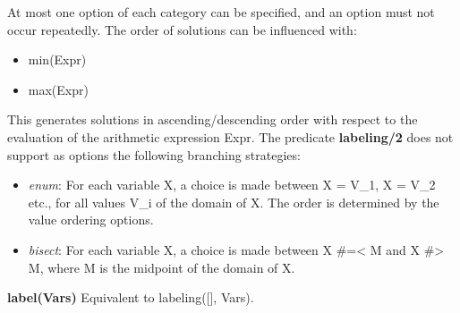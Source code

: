 At most one option of each category can be specified, and an option must not occur repeatedly.\newline
The order of solutions can be influenced with:\newline
\begin{itemize}
    \item min(Expr)
    \item max(Expr)
\end{itemize}

This generates solutions in ascending/descending order with respect to the evaluation of the arithmetic expression Expr.\newline
The predicate \textbf{labeling/2} does not support as options the following branching strategies:\newline
\begin{itemize}
    \item \textit{enum}: For each variable X, a choice is made between X = V\_1, X = V\_2 etc., for all values V\_i of the domain of X. The order is determined by the value ordering options.
    \item \textit{bisect}: For each variable X, a choice is made between X \#=< M and X \#> M, where M is the midpoint of the domain of X.
\end{itemize}
\textbf{label(Vars)}\newline\newline
Equivalent to labeling([], Vars).


